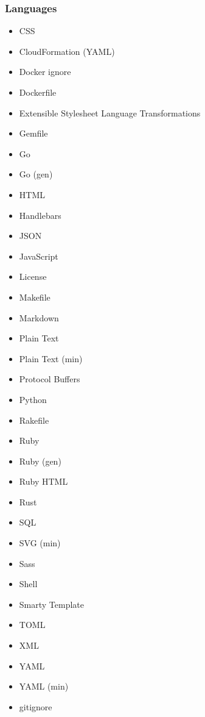 \subsubsection{Languages} \label{cs_languages}
\begin{multicols}{3}

	\begin{itemize}
		\item CSS
		\item CloudFormation (YAML)
		\item Docker ignore
		\item Dockerfile
		\item Extensible Stylesheet Language Transformations
		\item Gemfile
		\item Go
		\item Go (gen)
		\item HTML
		\item Handlebars
		\item JSON
		\item JavaScript
		\item License
		\item Makefile
		\item Markdown
		\item Plain Text
		\item Plain Text (min)
		\item Protocol Buffers
		\item Python
		\item Rakefile
		\item Ruby
		\item Ruby (gen)
		\item Ruby HTML
		\item Rust
		\item SQL
		\item SVG (min)
		\item Sass
		\item Shell
		\item Smarty Template
		\item TOML
		\item XML
		\item YAML
		\item YAML (min)
		\item gitignore
	\end{itemize}
\end{multicols}
